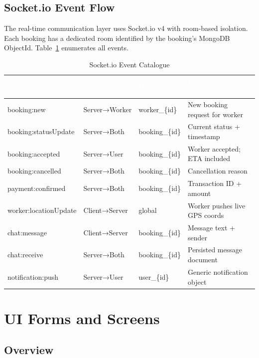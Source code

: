 \documentclass[12pt,a4paper]{report}
\newcommand{\thead}[1]{\cellcolor{tableheader}\textcolor{white}{\textbf{#1}}}
\begin{document}
\section{Socket.io Event Flow}

The real-time communication layer uses Socket.io v4 with room-based isolation. Each booking has a dedicated room identified by the booking's MongoDB ObjectId. Table~\ref{tab:socketevents} enumerates all events.

\begin{table}[h!]
\centering
\caption{Socket.io Event Catalogue}
\label{tab:socketevents}
\renewcommand{\arraystretch}{1.3}
\begin{tabular}{|p{4cm}|p{2.5cm}|p{2cm}|p{5cm}|}
\hline
\thead{Event Name} & \thead{Direction} & \thead{Room} & \thead{Payload / Purpose} \\
\hline
booking:new & Server→Worker & worker\_\{id\} & New booking request for worker \\
booking:statusUpdate & Server→Both & booking\_\{id\} & Current status + timestamp \\
booking:accepted & Server→User & booking\_\{id\} & Worker accepted; ETA included \\
booking:cancelled & Server→Both & booking\_\{id\} & Cancellation reason \\
payment:confirmed & Server→Both & booking\_\{id\} & Transaction ID + amount \\
worker:locationUpdate & Client→Server & global & Worker pushes live GPS coords \\
chat:message & Client→Server & booking\_\{id\} & Message text + sender \\
chat:receive & Server→Both & booking\_\{id\} & Persisted message document \\
notification:push & Server→User & user\_\{id\} & Generic notification object \\
\hline
\end{tabular}
\end{table}

\chapter{UI Forms and Screens}

\section{Overview}
\end{document}
